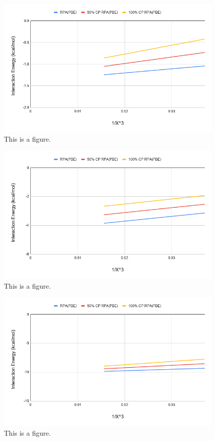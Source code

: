 \documentclass[11pt]{article}
\begin{document}
\begin{figure}
  \includegraphics[scale=0.5]{tpssh_27.png}
  \caption{This is a figure.}
  \label{fig:<name>}
\end{figure}

\begin{figure}
  \includegraphics[scale=0.5]{tpssh_30.png}
  \caption{This is a figure.}
  \label{fig:<name>}
\end{figure}

\begin{figure}
  \includegraphics[scale=0.5]{tpssh_38.png}
  \caption{This is a figure.}
  \label{fig:<name>}
\end{figure}
\end{document}
